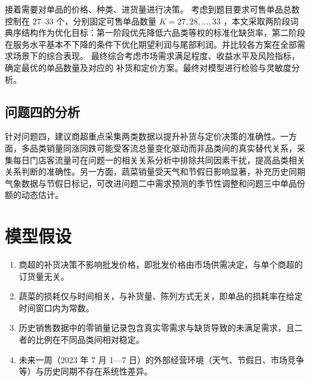 \documentclass[withoutpreface,bwprint]{cumcmthesis} %
\numberwithin{equation}{section}
\begin{document}
接着需要对单品的价格、种类、进货量进行决策。
考虑到题目要求可售单品总数控制在 $27$--$33$ 个，分别固定可售单品数量
$K=27,28,\ldots,33$ ，本文采取两阶段词典序结构作为优化目标：第一阶段优先降低六品类等权的标准化缺货率，第二阶段在服务水平基本不下降的条件下优化期望利润与尾部利润。并比较各方案在全部需求场景下的综合表现。
最终综合考虑市场需求满足程度、收益水平及风险指标，确定最优的单品数量及对应的
补货和定价方案。最终对模型进行检验与灵敏度分析。

\subsection{问题四的分析}

针对问题四，建议商超重点采集两类数据以提升补货与定价决策的准确性。一方面，多品类销量同涨同跌可能受客流总量变化驱动而非品类间的真实替代关系，采集每日门店客流量可在问题一的相关关系分析中排除共同因素干扰，提高品类相关关系判断的准确性。另一方面，蔬菜销量受天气和节假日影响显著，补充历史同期气象数据与节假日标记，可改进问题二中需求预测的季节性调整和问题三中单品份额的动态估计。

\section{模型假设}

\begin{enumerate}[leftmargin=2em,itemsep=0pt,parsep=0pt,topsep=2pt]
    \item 商超的补货决策不影响批发价格，即批发价格由市场供需决定，与单个商超的订货量无关。
    \item 蔬菜的损耗仅与时间相关，与补货量、陈列方式无关，即单品的损耗率在给定时间窗口内为常数。
    \item 历史销售数据中的零销量记录包含真实零需求与缺货导致的未满足需求，且二者的比例在不同品类间相对稳定。
    \item 未来一周（2023 年 7 月 1—7 日）的外部经营环境（天气、节假日、市场竞争等）与历史同期不存在系统性差异。
\end{enumerate}

\end{document}
